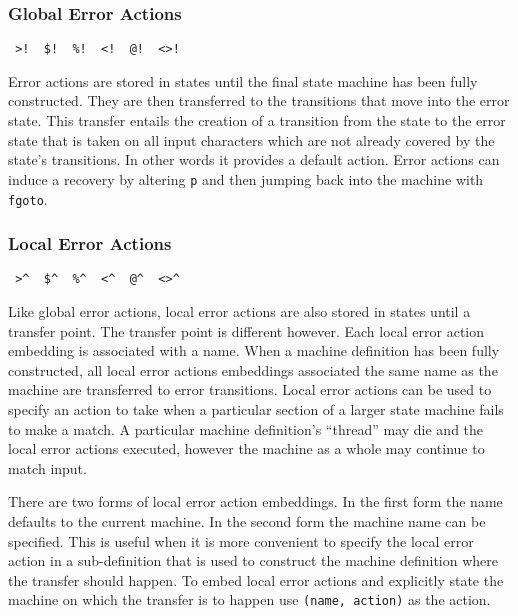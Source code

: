 \documentclass[letterpaper,11pt,oneside]{book}
\newcommand{\verbspace}{\vspace{10pt}}
\begin{document}
\subsubsection{Global Error Actions}

\verb| >!  $!  %!  <!  @!  <>! | 
\verbspace

Error actions are stored in states until the final state machine has been fully
constructed. They are then transferred to the transitions that move into the
error state. This transfer entails the creation of a transition from the state
to the error state that is taken on all input characters which are not already
covered by the state's transitions. In other words it provides a default
action. Error actions can induce a recovery by altering \verb|p| and then jumping back
into the machine with \verb|fgoto|.

\subsubsection{Local Error Actions}

\verb| >^  $^  %^  <^  @^  <>^ | 
\verbspace

Like global error actions, local error actions are also stored in states until
a transfer point. The transfer point is different however. Each local error action
embedding is associated with a name. When a machine definition has been fully
constructed, all local error actions embeddings associated the same name as the
machine are transferred to error transitions. Local error actions can be used
to specify an action to take when a particular section of a larger state
machine fails to make a match. A particular machine definition's ``thread'' may
die and the local error actions executed, however the machine as a whole may
continue to match input.

There are two forms of local error action embeddings. In the first form the name defaults
to the current machine. In the second form the machine name can be specified.  This
is useful when it is more convenient to specify the local error action in a
sub-definition that is used to construct the machine definition where the
transfer should happen. To embed local error actions and explicitly state the
machine on which the transfer is to happen use \verb|(name, action)| as the
action.

\begin{comment}
\begin{itemize}
\setlength{\parskip}{0in}
\item \verb|expr >^ (name, action) | -- Start state.
\item \verb|expr $^ (name, action) | -- All states.
\item \verb|expr %^ (name, action) | -- Final states.
\item \verb|expr <^ (name, action) | -- Not start state.
\item \verb|expr <>^ (name, action)| -- Not start and not final states.
\end{itemize}
\end{comment}
\end{document}
